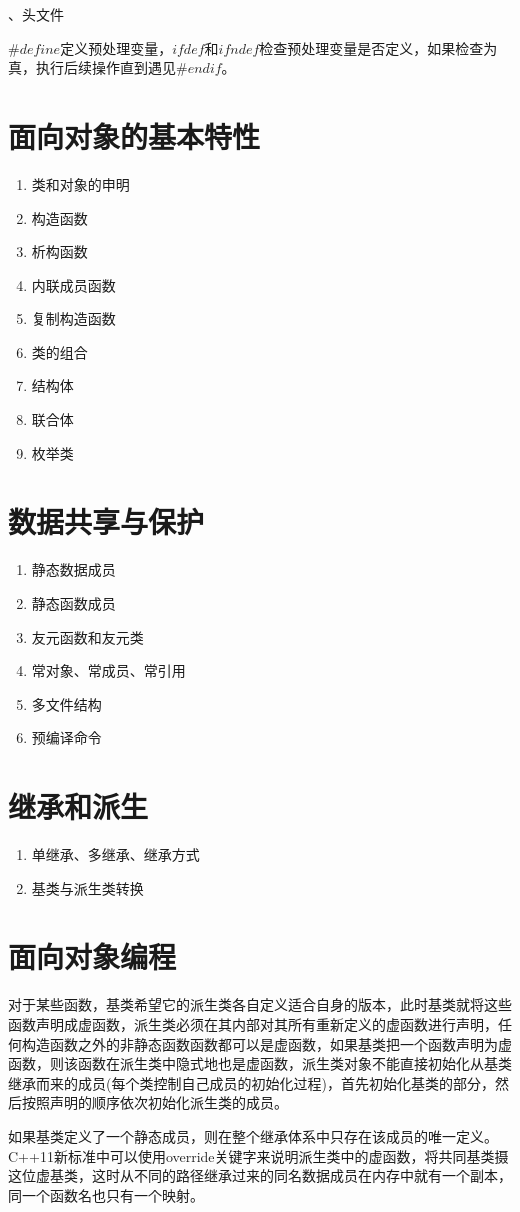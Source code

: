 \documentclass{article}
\begin{document}
	、头文件
	
	$\#define$定义预处理变量，$ifdef 和 ifndef$检查预处理变量是否定义，如果检查为真，执行后续操作直到遇见$\#endif$。
	
	\section{面向对象的基本特性}
	\begin{enumerate}
		\item 类和对象的申明\\
		\item 构造函数
		\item 析构函数
		\item 内联成员函数
		\item 复制构造函数
		\item 类的组合	
		\item 结构体
		\item 联合体
		\item 枚举类	
	\end{enumerate}
	\section{数据共享与保护}
	\begin{enumerate}
		\item 静态数据成员
		\item 静态函数成员
		\item 友元函数和友元类
		\item 常对象、常成员、常引用
		\item 多文件结构
		\item 预编译命令
	\end{enumerate}
	\section{继承和派生}
	\begin{enumerate}
		\item 单继承、多继承、继承方式
		\item 基类与派生类转换	
	\end{enumerate}
	\section{面向对象编程}
	对于某些函数，基类希望它的派生类各自定义适合自身的版本，此时基类就将这些函数声明成虚函数，派生类必须在其内部对其所有重新定义的虚函数进行声明，任何构造函数之外的非静态函数函数都可以是虚函数，如果基类把一个函数声明为虚函数，则该函数在派生类中隐式地也是虚函数，派生类对象不能直接初始化从基类继承而来的成员(每个类控制自己成员的初始化过程)，首先初始化基类的部分，然后按照声明的顺序依次初始化派生类的成员。
	
	如果基类定义了一个静态成员，则在整个继承体系中只存在该成员的唯一定义。C++11新标准中可以使用override关键字来说明派生类中的虚函数，将共同基类摄这位虚基类，这时从不同的路径继承过来的同名数据成员在内存中就有一个副本，同一个函数名也只有一个映射。
	
\end{document}
